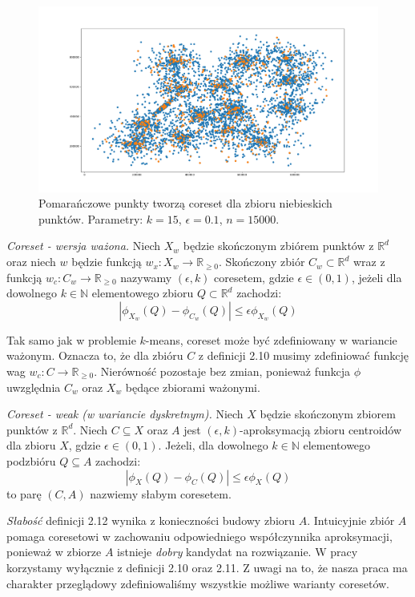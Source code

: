 \begin{figure}[H]
    \centering
    \includegraphics[totalheight=7cm]{coreset.png}
    \caption{Pomarańczowe punkty tworzą coreset dla zbioru niebieskich punktów. 
    Parametry: $k=15$, $\epsilon = 0.1$, $n = 15000$.}
\end{figure}

\begin{definition}
    \emph{Coreset - wersja ważona.} Niech $X_{w}$ będzie skończonym zbiórem punktów z $\mathbb{R}^{d}$ oraz niech $w$ będzie funkcją $w_{x}: X_{w} \rightarrow \mathbb{R}_{\ge0}$.
    Skończony zbiór $C_{w} \subset \mathbb{R}^{d}$ wraz z funkcją $w_{c}: C_{w} \rightarrow \mathbb{R}_{\ge0}$ nazywamy $(\epsilon, k)$ coresetem, gdzie $\epsilon \in (0, 1)$, jeżeli dla dowolnego $k \in \mathbb{N}$ elementowego zbioru $Q \subset \mathbb{R}^{d}$ zachodzi:
    \begin{equation}
        |\phi_{X_{w}}(Q) - \phi_{C_{w}}(Q)| \leq \epsilon\phi_{X_{w}}(Q)
    \end{equation}
\end{definition}

\noindent
Tak samo jak w problemie $k$-means, coreset może być zdefiniowany w wariancie ważonym.
Oznacza to, że dla zbióru $C$ z definicji 2.10  musimy zdefiniować funkcję wag $w_{c}: C \rightarrow \mathbb{R}_{\ge0}$.
Nierówność pozostaje bez zmian, ponieważ funkcja $\phi$ uwzględnia $C_{w}$ oraz $X_{w}$ będące zbiorami ważonymi.

\begin{definition}
    \emph{Coreset - weak (w wariancie dyskretnym).} Niech $X$ będzie skończonym zbiorem punktów z $\mathbb{R}^{d}$.
    Niech $C \subseteq X$ oraz $A$ jest $(\epsilon, k)$-aproksymacją zbioru centroidów dla zbioru $X$, gdzie $\epsilon \in (0, 1)$.
    Jeżeli, dla dowolnego $k \in \mathbb{N}$ elementowego podzbióru $Q \subseteq A$ zachodzi:
    \begin{equation}
        |\phi_{X}(Q) - \phi_{C}(Q)| \leq \epsilon\phi_{X}(Q)
    \end{equation}
    to parę $(C, A)$ nazwiemy słabym coresetem.
\end{definition}

\noindent
\textit{Słabość} definicji 2.12 wynika z konieczności budowy zbioru $A$.
Intuicyjnie zbiór $A$ pomaga coresetowi w zachowaniu odpowiedniego współczynnika aproksymacji, ponieważ w zbiorze $A$ istnieje \textit{dobry} kandydat na rozwiązanie.
W pracy korzystamy wyłącznie z definicji 2.10 oraz 2.11.
Z uwagi na to, że nasza praca ma charakter przeglądowy zdefiniowaliśmy wszystkie możliwe warianty coresetów.